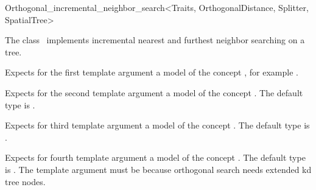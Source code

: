 

\begin{ccRefClass}{Orthogonal_incremental_neighbor_search<Traits, OrthogonalDistance, Splitter, SpatialTree>}


\ccDefinition

The class \ccRefName\ implements incremental nearest and furthest neighbor searching on a tree.


\ccParameters

Expects for the first template argument a model of the concept ,
for example .

Expects for the second template argument a model of the
concept . The default type is 
.

Expects for third template argument a model of the concept .
The default type is .

Expects for fourth template argument a model of the concept .
The default type is . The 
template argument must be  because orthogonal search needs extended 
kd tree nodes.

\ccTypes


\ccCreation
{}  %


\end{ccRefClass}
